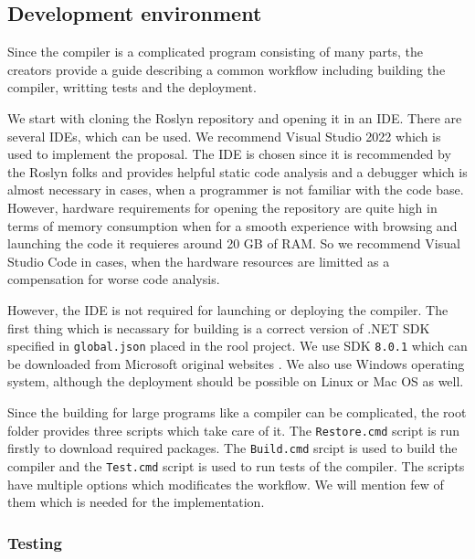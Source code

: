\subsection{Development environment}

Since the compiler is a complicated program consisting of many parts, the creators provide a guide \cite{online:roslynGuide} describing a common workflow including building the compiler, writting tests and the deployment.
\par
We start with cloning the Roslyn repository \cite{online:roslynRepo} and opening it in an IDE.
There are several IDEs, which can be used.
We recommend Visual Studio 2022 \cite{online:vs} which is used to implement the proposal.
The IDE is chosen since it is recommended by the Roslyn folks and provides helpful static code analysis and a debugger which is almost necessary in cases, when a programmer is not familiar with the code base.
However, hardware requirements for opening the repository are quite high in terms of memory consumption when for a smooth experience with browsing and launching the code it requieres around 20 GB of RAM.
So we recommend Visual Studio Code \cite{online:vsCode} in cases, when the hardware resources are limitted as a compensation for worse code analysis.
\par
However, the IDE is not required for launching or deploying the compiler.
The first thing which is necassary for building is a correct version of .NET SDK specified in \texttt{global.json} placed in the rool project.
We use SDK \texttt{8.0.1} which can be downloaded from Microsoft original websites \cite{online:sdk}.
We also use Windows operating system, although the deployment should be possible on Linux or Mac OS as well.
\par
Since the building for large programs like a compiler can be complicated, the root folder provides three scripts which take care of it.
The \texttt{Restore.cmd} script is run firstly to download required packages.
The \texttt{Build.cmd} srcipt is used to build the compiler and the \texttt{Test.cmd} script is used to run tests of the compiler.
The scripts have multiple options which modificates the workflow.
We will mention few of them which is needed for the implementation.

\subsubsection{Testing}

